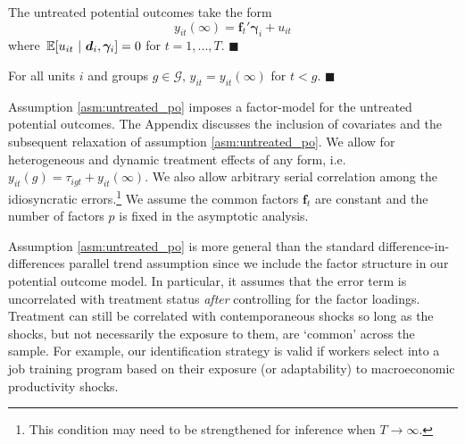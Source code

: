 \documentclass[12pt]{article}
\begin{document}
\begin{assumption}\label{asm:untreated_po}
The untreated potential outcomes take the form
\begin{equation*}
  y_{it}(\infty) = \bm f_t' \bm \gamma_i + u_{it}
\end{equation*}
where $\expec{u_{it}}{\bm d_i, \bm \gamma_i} = 0$ for $t = 1,...,T$. $\blacksquare$
\end{assumption}

\begin{assumption}\label{asm:no_anticipation}
For all units $i$ and groups $g \in \mathcal{G}$, $y_{it} = y_{it}(\infty)$ for $t < g$. $\blacksquare$ %
\end{assumption}

Assumption \ref{asm:untreated_po} imposes a factor-model for the untreated potential outcomes. The Appendix discusses the inclusion of covariates and the subsequent relaxation of assumption \ref{asm:untreated_po}. We allow for heterogeneous and dynamic treatment effects of any form, i.e. $y_{it}(g) = \tau_{igt} + y_{it}(\infty)$. We also allow arbitrary serial correlation among the idiosyncratic errors.\footnote{This condition may need to be strengthened for inference when $T \rightarrow \infty$.} We assume the common factors $\bm f_t$ are constant and the number of factors $p$ is fixed in the asymptotic analysis. 

Assumption \ref{asm:untreated_po} is more general than the standard difference-in-differences parallel trend assumption since we include the factor structure in our potential outcome model. In particular, it assumes that the error term is uncorrelated with treatment status \emph{after} controlling for the factor loadings. Treatment can still be correlated with contemporaneous shocks so long as the shocks, but not necessarily the exposure to them, are `common' across the sample. For example, our identification strategy is valid if workers select into a job training program based on their exposure (or adaptability) to macroeconomic productivity shocks. 
\end{document}
